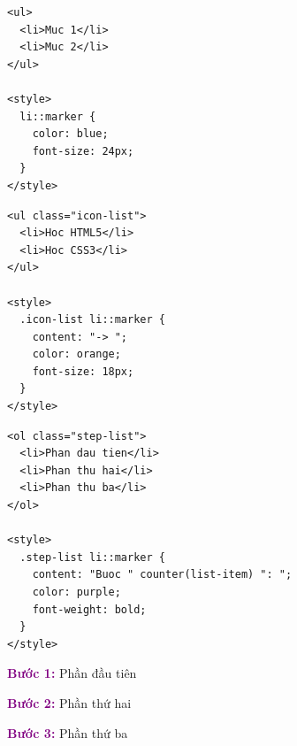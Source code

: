 \documentclass[11pt,oneside]{book}
\newcommand{\thd}[1]{\textcolor{white}{\textbf{\strut #1}}}
\newcommand{\codeinline}[1]{\textcolor{accentOrange}{\texttt{#1}}}
\begin{document}
\begin{codeWindow}
\begin{lstlisting}[language=HTML5]
<ul>
  <li>Muc 1</li>
  <li>Muc 2</li>
</ul>

<style>
  li::marker {
    color: blue;
    font-size: 24px;
  }
</style>
\end{lstlisting}
\end{codeWindow}

\begin{codeWindow}
\begin{lstlisting}[language=HTML5]
<ul class="icon-list">
  <li>Hoc HTML5</li>
  <li>Hoc CSS3</li>
</ul>

<style>
  .icon-list li::marker {
    content: "-> ";
    color: orange;
    font-size: 18px;
  }
</style>
\end{lstlisting}
\end{codeWindow}

\begin{codeWindow}
\begin{lstlisting}[language=HTML5]
<ol class="step-list">
  <li>Phan dau tien</li>
  <li>Phan thu hai</li>
  <li>Phan thu ba</li>
</ol>

<style>
  .step-list li::marker {
    content: "Buoc " counter(list-item) ": ";
    color: purple;
    font-weight: bold;
  }
</style>
\end{lstlisting}
\end{codeWindow}

\begin{browserWindow}
\sffamily\small
\textcolor{purple}{\textbf{Bước 1:}} Phần đầu tiên \par
\textcolor{purple}{\textbf{Bước 2:}} Phần thứ hai \par
\textcolor{purple}{\textbf{Bước 3:}} Phần thứ ba
\end{browserWindow}

\begin{prettyTableBox}
\sffamily\small
{}
\end{prettyTableBox}
\end{document}
